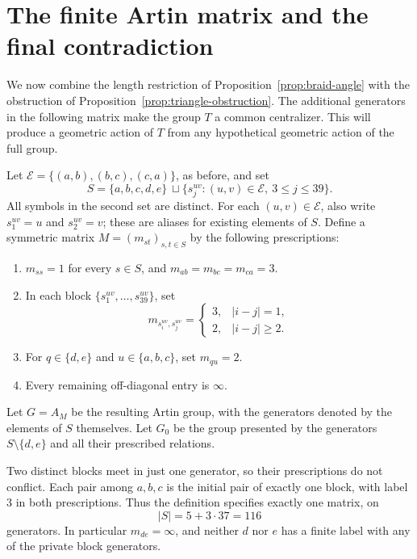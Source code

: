 \section{The finite Artin matrix and the final contradiction}
\label{sec:assembly}

We now combine the length restriction of Proposition~\ref{prop:braid-angle}
with the obstruction of Proposition~\ref{prop:triangle-obstruction}.
The additional generators in the following matrix make the group $T$ a
common centralizer.  This will produce a geometric action of $T$ from
any hypothetical geometric action of the full group.

\begin{definition}\label{def:matrix}
Let $\mathcal E=\{(a,b),(b,c),(c,a)\}$, as before, and set
\[
 S=\{a,b,c,d,e\}\ \sqcup
   \{s_j^{uv}:(u,v)\in\mathcal E,\ 3\le j\le39\}.
\]
All symbols in the second set are distinct.  For each $(u,v)\in\mathcal E$,
also write $s_1^{uv}=u$ and $s_2^{uv}=v$; these are aliases for existing
elements of $S$.  Define a symmetric matrix $M=(m_{st})_{s,t\in S}$ by
the following prescriptions:
\begin{enumerate}
\item $m_{ss}=1$ for every $s\in S$, and
      $m_{ab}=m_{bc}=m_{ca}=3$.
\item In each block $\{s_1^{uv},\ldots,s_{39}^{uv}\}$, set
      \[
      m_{s_i^{uv},s_j^{uv}}=
      \begin{cases}
      3,&|i-j|=1,\\
      2,&|i-j|\ge2.
      \end{cases}
      \]
\item For $q\in\{d,e\}$ and $u\in\{a,b,c\}$, set $m_{qu}=2$.
\item Every remaining off-diagonal entry is $\infty$.
\end{enumerate}
Let $G=A_M$ be the resulting Artin group, with the generators denoted
by the elements of $S$ themselves.  Let $G_0$ be the group presented
by the generators $S\setminus\{d,e\}$ and all their prescribed relations.
\end{definition}

Two distinct blocks meet in just one generator, so their prescriptions
do not conflict.  Each pair among $a,b,c$ is the initial pair of exactly
one block, with label $3$ in both prescriptions.  Thus the definition
specifies exactly one matrix, on
\[
 |S|=5+3\cdot37=116
\]
generators.  In particular $m_{de}=\infty$, and neither $d$ nor $e$
has a finite label with any of the private block generators.

